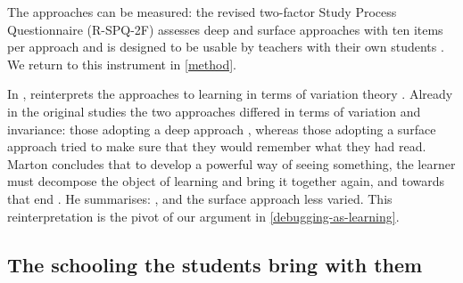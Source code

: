 
The approaches can be measured: the revised two-factor Study Process
Questionnaire (R-SPQ-2F) assesses deep and surface approaches with ten items
per approach and is designed to be usable by teachers with their own students
\autocite{RSPQ2F}.
We return to this instrument in \cref{method}.

In , \citeauthor{NCOL} reinterprets the approaches to learning
in terms of variation theory \autocite[pp.~142--146]{NCOL}.
Already in the original studies the two approaches differed in terms of
variation and invariance: those adopting a deep approach
, whereas those adopting a
surface approach tried to make sure that they would remember what they had
read.
Marton concludes that to develop a powerful way of seeing something, the
learner must decompose the object of learning and bring it together again,
and towards that end
.
He summarises: , and the surface approach less varied.
This reinterpretation is the pivot of our argument in
\cref{debugging-as-learning}.

\subsection{The schooling the students bring with them}
\label{schooling}

